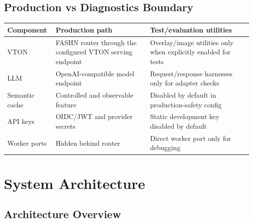 \documentclass[12pt,a4paper,oneside]{report}
\begin{document}
\section{Production vs Diagnostics Boundary}

\begin{longtable}{p{3.4cm}p{5.8cm}p{5.8cm}}
\toprule
\textbf{Component} & \textbf{Production path} & \textbf{Test/evaluation utilities} \\
\midrule
VTON & FASHN router through the configured VTON serving endpoint & Overlay/image utilities only when explicitly enabled for tests \\
LLM & OpenAI-compatible model endpoint & Request/response harnesses only for adapter checks \\
Semantic cache & Controlled and observable feature & Disabled by default in production-safety config \\
API keys & OIDC/JWT and provider secrets & Static development key disabled by default \\
Worker ports & Hidden behind router & Direct worker port only for debugging \\
\bottomrule
\end{longtable}

\chapter{System Architecture}

\section{Architecture Overview}
\end{document}
